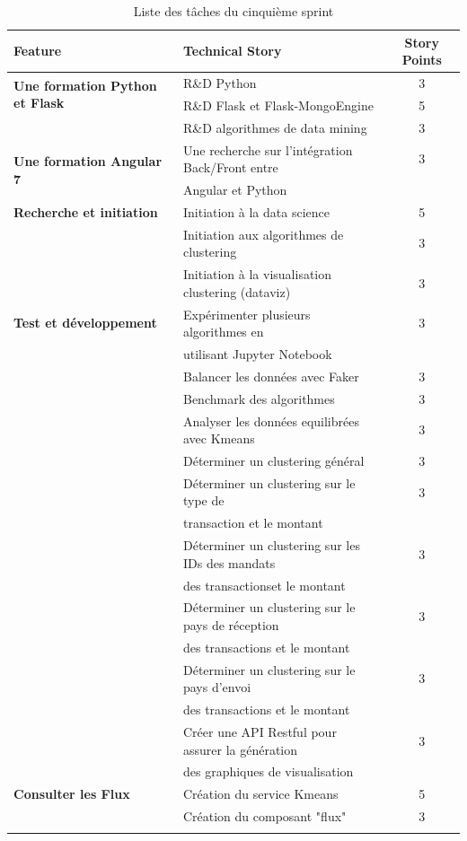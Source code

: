 \begin{longtable}[!ht]{|l|l|c|}
\hline
{\textbf{Feature}} & {\textbf{Technical Story}} & {\textbf{Story Points}}\\
\hline
\multirow{2}{3cm}{\textbf{ Une formation Python et Flask}} & R\&D Python   & 3 \\
\cline{2-3}
& R\&D Flask et Flask-MongoEngine  & 5 \\
\cline{2-3}
&  R\&D algorithmes de data mining & 3 \\
\hline
\multirow{2}{4cm}{\textbf{Une formation Angular 7}} 
& Une recherche sur l'intégration Back/Front entre  & 3 \\
&Angular et Python &\\

\hline
\multirow{1}{4cm}{\textbf{Recherche et initiation}} & Initiation à la data science & 5  \\
\cline{2-3}
 &Initiation aux algorithmes de clustering  & 3\\
\cline{2-3}
 &Initiation à la visualisation clustering (dataviz) & 3\\
\hline
{\textbf{Test et développement }} & Expérimenter plusieurs algorithmes en & 3\\& utilisant Jupyter Notebook&\\
\cline{2-3}
 &Balancer les données avec Faker  & 3\\
 \cline{2-3}
 &Benchmark des algorithmes  & 3\\
\cline{2-3}
 &Analyser les données equilibrées avec Kmeans& 3\\
 \cline{2-3}
 &Déterminer un clustering général& 3\\
\cline{2-3}
 &Déterminer un clustering sur le type de&3 \\ & transaction et le montant& \\
\cline{2-3}
 &Déterminer un clustering sur les IDs des mandats & 3\\ &des transactionset le montant&\\
\cline{2-3}
 &Déterminer un clustering sur le pays de réception & 3\\ &  des transactions et le montant&\\
\cline{2-3}
 &Déterminer un clustering sur le pays d'envoi  & 3\\ & des transactions et le montant& \\
\cline{2-3}
 &Créer une API Restful pour assurer la génération  & 3\\ & des graphiques de visualisation & \\
\cline{2-3}
\hline
\multirow{1}{4cm}{\textbf{Consulter les Flux }} & Création du service Kmeans  & 5  \\
\cline{2-3}
 &Création du composant "flux" & 3\\
\hline

\caption{Liste des t\^aches du cinquième sprint}
\label{tab:sprint5backlog}
\end{longtable}

